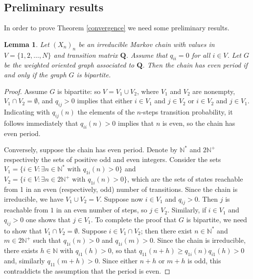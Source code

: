 \documentclass[article,12pt]{article}
\theoremstyle{plain}
\newtheorem{lemma}[theorem]{Lemma}
\theoremstyle{definition}
\theoremstyle{remark}
\numberwithin{equation}{section}
\numberwithin{theorem}{section}
\newcommand{\N}{\mathbb N}
\begin{document}
		\subsection{Preliminary results}
		
		In order to prove Theorem \ref{convergence} we need some preliminary results. 
		\begin{lemma}\label{Lemma1}
			Let $(X_n)_n$ be an irreducible Markov chain with values in $V=\{1,2,\ldots, N\}$ and  transition matrix $\mathbf{Q}$. Assume that $q_{ii} = 0$ for all $i \in V$. Let $G$ be the weighted oriented graph associated to $\mathbf{Q}$. Then the chain has even period if and only if the graph $G$ is bipartite. 
		\end{lemma}
		\begin{proof}
			Assume $G$ is bipartite: so $V = V_1 \cup V_2$, where $V_1$ and $V_2$ are nonempty, $V_1 \cap V_2 = \emptyset$, and $q_{ij}>0$ implies that either $i \in V_1$ and $j \in V_2$ or $i \in V_2$ and $j \in V_1$. Indicating with $q_{ij}(n)$ the elements of the $n$-steps transition probability, it follows immediately that $q_{ii}(n) > 0$ implies that $n$ is even, so the chain has even period. 
			
			Conversely, suppose the chain has even period.
			Denote by $\N^*$ and $2\N^+$ respectively the sets of positive odd and even integers.
			Consider the sets $V_1=\{i\in V : \exists n\in \N^* \mbox{ with } q_{1i}(n)>0\}$ and 
			$V_2=\{i\in V: \exists n\in 2\N^+ \mbox{ with } q_{1i}(n)>0\}$, which are the sets of states reachable from 1 in an even (respectively, odd) number of transitions. Since the chain is irreducible, we have $V_1\cup V_2=V$. Suppose now $i \in V_1$ and $q_{ij}>0$. Then $j$ is reachable from $1$ in an even number of steps, so $j \in V_2$. Similarly, if $i \in V_1$ and $q_{ij}>0$ one shows that $j \in V_1$. To complete the proof that $G$ is bipartite, we need to show that $V_1 \cap V_2 = \emptyset$. Suppose $i \in V_1 \cap V_2$; then there exist $n \in \N^*$ and $m \in 2\N^+$ such that $q_{1i}(n)>0$ and $q_{1i}(m) >0$. Since the chain is irreducible, there exists $h \in \N$ with $q_{i1}(h)>0$, so that $q_{11}(n+h) \geq  q_{1i}(n)q_{i1}(h) >0$ and, similarly $q_{11}(m+h)>0$. Since either $n+h$ or $m+h$ is odd, this contraddicts the assumption that the period is even.
		\end{proof}      
		
\end{document}
